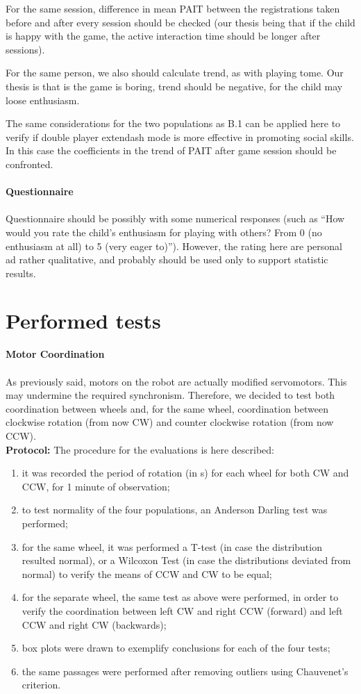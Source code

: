\documentclass[a4paper,twoside]{book}
\begin{document}
For the same session, difference in mean PAIT between the registrations taken before and after every session should be checked (our thesis being that if the child is happy with the game, the active interaction time should be longer after sessions).

For the same person, we also should calculate trend, as with playing tome. Our thesis is that is the game is boring, trend should be negative, for the child may loose enthusiasm.

The same considerations for the two populations as B.1 can be applied here to verify if double player	extendash mode is more effective in promoting social skills. In this case the coefficients in the trend of PAIT after game session should be confronted.
\\
\\
\textbf{Questionnaire}
\\
\\
Questionnaire should be possibly with some numerical responses (such as \textquotedblleft How would you rate the child's enthusiasm for playing with others? From 0 (no enthusiasm at all) to 5 (very eager to)\textquotedblright). However, the rating here are personal ad rather qualitative, and probably should be used only to support statistic results.
\\
\section{Performed tests}
\textbf{Motor Coordination}
\\
\\
As previously said, motors on the robot are actually modified servomotors. This may undermine the required synchronism. Therefore, we decided to test both coordination between wheels and, for the same wheel, coordination between clockwise rotation (from now CW) and counter clockwise rotation (from now CCW). 
\\

\textbf{Protocol:}
The procedure for the evaluations is here described:
\begin{enumerate}
\item it was recorded the period of rotation (in s) for each wheel for both CW and CCW, for 1 minute of observation;
\item to test normality of the four populations, an Anderson Darling test was performed;
\item for the same wheel, it was performed a T-test (in case the distribution resulted normal), or a Wilcoxon Test (in case the distributions deviated from normal) to verify the means of CCW and CW to be equal;
\item for the separate wheel, the same test as above were performed, in order to verify the coordination between left CW and right CCW (forward) and left CCW and right CW (backwards);
\item box plots were drawn to exemplify conclusions for each of the four tests;
\item the same passages were performed after removing outliers using Chauvenet's criterion.
\end{enumerate}
\end{document}
